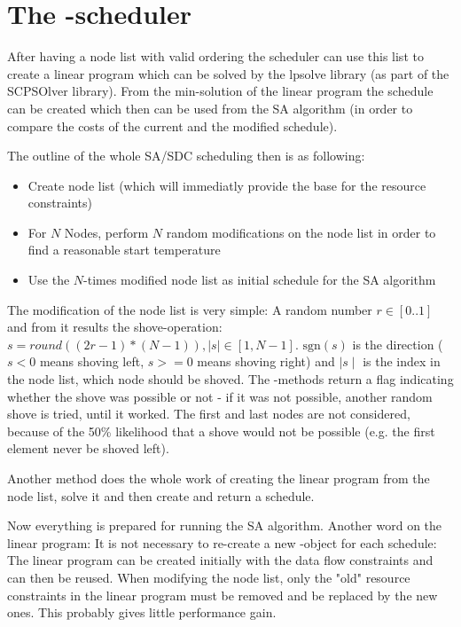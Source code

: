 \section{The -scheduler}
After having a node list with valid ordering the scheduler can use this list to create a linear program which can be solved by the lpsolve library (as part of the SCPSOlver library). From the min-solution of the linear program the schedule can be created which then can be used from the SA algorithm (in order to compare the costs of the current and the modified schedule).\par
The outline of the whole SA/SDC scheduling then is as following:
\begin{itemize}
	\item{Create node list (which will immediatly provide the base for the resource constraints)}
	\item{For $N$ Nodes, perform $N$ random modifications on the node list in order to find a reasonable start temperature}
	\item{Use the $N$-times modified node list as initial schedule for the SA algorithm}
\end{itemize}

The modification of the node list is very simple: A random number $r \in [0..1]$ and from it results the shove-operation: $s = round((2r-1)*(N-1)), \mid s \mid \in [1, N-1]$. $\text{sgn}(s)$ is the direction ($s<0$ means shoving left, $s>=0$ means shoving right) and $\mid s \mid$ is the index in the node list, which node should be shoved. The -methods return a flag indicating whether the shove was possible or not - if it was not possible, another random shove is tried, until it worked. The first and last nodes are not considered, because of the 50\% likelihood that a shove would not be possible (e.g. the first element never be shoved left).\par
Another method  does the whole work of creating the linear program from the node list, solve it and then create and return a schedule.\par
Now everything is prepared for running the SA algorithm. Another word on the linear program: It is not necessary to re-create a new -object for each schedule: The linear program can be created initially with the data flow constraints and can then be reused. When modifying the node list, only the "old" resource constraints in the linear program must be removed and be replaced by the new ones. This probably gives little performance gain.
